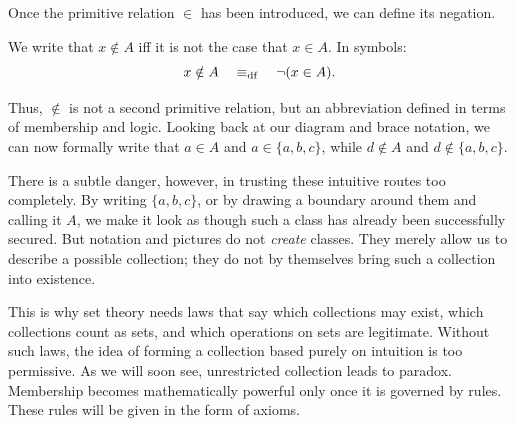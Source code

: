 Once the primitive relation $\in$ has been introduced, we can define its negation.

\begin{definition}
  We write that $x \notin A$ iff it is not the case that $x \in A$. In symbols:
\[
x \notin A \quad \mathrel{\equiv_{\mathrm{df}}} \quad \neg(x \in A).
\]
\end{definition}

Thus, $\notin$ is not a second primitive relation, but an abbreviation defined in terms of membership and logic. Looking back at our diagram and brace notation, we can now formally write that $a \in A$ and $a \in \{a,b,c\}$, while $d \notin A$ and $d \notin \{a,b,c\}$.

There is a subtle danger, however, in trusting these intuitive routes too completely. By writing $\{a,b,c\}$, or by drawing a boundary around them and calling it $A$, we make it look as though such a class has already been successfully secured. But notation and pictures do not \textit{create} classes. They merely allow us to describe a possible collection; they do not by themselves bring such a collection into existence.

This is why set theory needs laws that say which collections may exist, which collections count as sets, and which operations on sets are legitimate. Without such laws, the idea of forming a collection based purely on intuition is too permissive. As we will soon see, unrestricted collection leads to paradox. Membership becomes mathematically powerful only once it is governed by rules. These rules will be given in the form of axioms.
